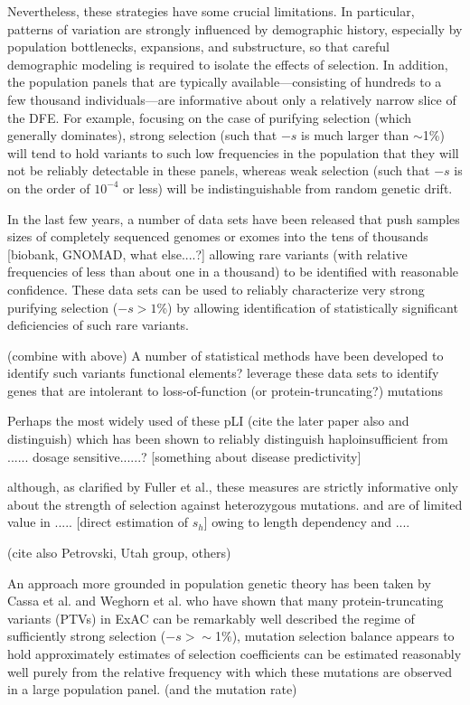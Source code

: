 \documentclass[11pt]{article}
\begin{document}
Nevertheless, these strategies have some crucial limitations.  In particular, patterns of variation are strongly influenced by demographic history, especially by population bottlenecks, expansions, and substructure, so that careful demographic modeling is required to isolate the effects of selection.  In addition, the population panels that are typically available---consisting of hundreds to a few thousand individuals---are informative about only a relatively narrow slice of the DFE.  For example, focusing on the case of purifying selection (which generally dominates), strong  selection (such that $-s$ is much larger than $\sim$1\%) will tend to hold variants to such low frequencies in the population that they will not be reliably detectable in these panels, whereas weak selection (such that $-s$ is on the order of $10^{-4}$ or less) will be indistinguishable from random genetic drift.  

In the last few years, a number of data sets have been released that 
push samples sizes of completely sequenced genomes or exomes into the tens of thousands
[biobank, GNOMAD, what else....?]
allowing rare variants (with relative frequencies of less than about one in a thousand) to be identified with reasonable confidence.
These data sets can be used to reliably characterize very strong purifying selection ($-s > 1$\%)
by allowing identification of statistically significant deficiencies of such rare variants.

(combine with above)
A number of statistical methods have been developed to identify such variants
functional elements?  
leverage these data sets to identify genes that are intolerant to loss-of-function (or protein-truncating?) mutations

Perhaps the most widely used of these 
pLI (cite the later paper also and distinguish)
which has been shown to reliably
distinguish haploinsufficient from ......   dosage sensitive......?
[something about disease predictivity]

although, as clarified by Fuller et al., these measures are strictly informative only about the strength of selection against heterozygous mutations.
and are of limited value in ..... [direct estimation of $s_h$]  owing to length dependency and ....

(cite also Petrovski, Utah group, others)

An approach more grounded in population genetic theory has been taken by Cassa et al. and Weghorn et al.
who have shown that
many protein-truncating variants (PTVs) in ExAC
can be remarkably well described the regime of sufficiently strong selection ($-s > \sim$1\%), 
mutation selection balance appears to hold approximately
estimates of selection coefficients can be estimated reasonably well purely from the relative frequency with which these mutations are observed in a large population panel. (and the mutation rate)
\end{document}
